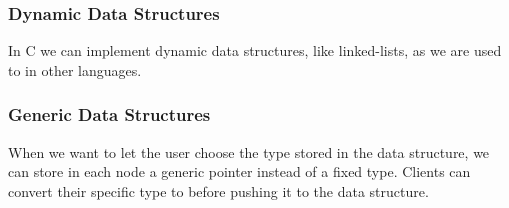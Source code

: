 \subsubsection{Dynamic Data Structures}
In C we can implement dynamic data structures, like linked-lists, as we are used to in other languages.

\subsubsection{Generic Data Structures}
When we want to let the user choose the type stored in the data structure, we can store in each node a generic pointer  instead of a fixed type. Clients can convert their specific type to  before pushing it to the data structure.
